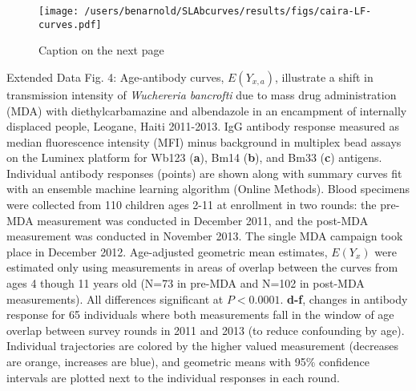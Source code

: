 \documentclass[11pt]{article}
\begin{document}
\clearpage
\begin{figure}[htbp]
\begin{center}
\texttt{[image: /users/benarnold/SLAbcurves/results/figs/caira-LF-curves.pdf]}
\begin{minipage}{\textwidth}
\caption{Caption on the next page}
\label{fig:cairaS5}
\end{minipage}
\end{center}
\end{figure}

\clearpage
Extended Data Fig. 4: Age-antibody curves, $E(Y_{x,a})$, illustrate a shift in transmission intensity of \textit{Wuchereria bancrofti} due to mass drug administration (MDA) with diethylcarbamazine and albendazole in an encampment of internally displaced people, Leogane, Haiti 2011-2013.  IgG antibody response measured as median fluorescence intensity (MFI) minus background in multiplex bead assays on the Luminex platform for Wb123 (\textbf{a}), Bm14 (\textbf{b}), and Bm33 (\textbf{c}) antigens. Individual antibody responses (points) are shown along with summary curves fit with an ensemble machine learning algorithm (Online Methods). Blood specimens were collected from 110 children ages 2-11 at enrollment in two rounds: the pre-MDA measurement was conducted in December 2011, and the post-MDA measurement was conducted in November 2013.  The single MDA campaign took place in December 2012. Age-adjusted geometric mean estimates, $E(Y_x)$ were estimated only using measurements in areas of overlap between the curves from ages 4 though 11 years old (N=73 in pre-MDA and N=102 in post-MDA measurements). All differences significant at $P<0.0001$. \textbf{d-f}, changes in antibody response for 65 individuals where both measurements fall in the window of age overlap between survey rounds in 2011 and 2013 (to reduce confounding by age). Individual trajectories are colored by the higher valued measurement (decreases are orange, increases are blue), and geometric means with 95\% confidence intervals are plotted next to the individual responses in each round.
\end{document}
